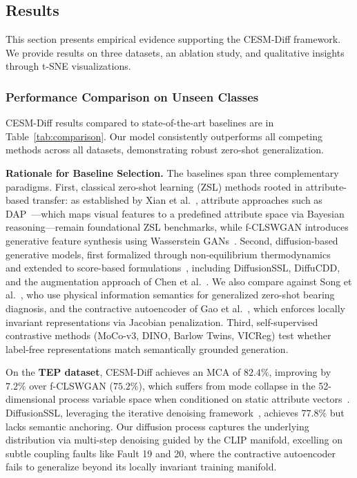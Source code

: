\subsection{Results}
\label{sec:results}

This section presents empirical evidence supporting the CESM-Diff framework. We provide results on three datasets, an ablation study, and qualitative insights through t-SNE visualizations.

\subsubsection{Performance Comparison on Unseen Classes}
CESM-Diff results compared to state-of-the-art baselines are in Table~\ref{tab:comparison}. Our model consistently outperforms all competing methods across all datasets, demonstrating robust zero-shot generalization.

\textbf{Rationale for Baseline Selection.}
The baselines span three complementary paradigms. First, classical zero-shot learning (ZSL) methods rooted in attribute-based transfer: as established by Xian et al.~\cite{xian2019zero}, attribute approaches such as DAP~\cite{lampert2009learning}---which maps visual features to a predefined attribute space via Bayesian reasoning---remain foundational ZSL benchmarks, while f-CLSWGAN introduces generative feature synthesis using Wasserstein GANs~\cite{goodfellow2014generative}. Second, diffusion-based generative models, first formalized through non-equilibrium thermodynamics~\cite{sohl2015deep} and extended to score-based formulations~\cite{song2020score}, including DiffusionSSL, DiffuCDD, and the augmentation approach of Chen et al.~\cite{chen2024diffusion}. We also compare against Song et al.~\cite{song2025generalized}, who use physical information semantics for generalized zero-shot bearing diagnosis, and the contractive autoencoder of Gao et al.~\cite{gao2019contractive}, which enforces locally invariant representations via Jacobian penalization. Third, self-supervised contrastive methods (MoCo-v3, DINO, Barlow Twins, VICReg) test whether label-free representations match semantically grounded generation.

On the \textbf{TEP dataset}, CESM-Diff achieves an MCA of $82.4\%$, improving by $7.2\%$ over f-CLSWGAN ($75.2\%$), which suffers from mode collapse in the 52-dimensional process variable space when conditioned on static attribute vectors~\cite{goodfellow2014generative}. DiffusionSSL, leveraging the iterative denoising framework~\cite{sohl2015deep}, achieves $77.8\%$ but lacks semantic anchoring. Our diffusion process captures the underlying distribution via multi-step denoising guided by the CLIP manifold, excelling on subtle coupling faults like Fault 19 and 20, where the contractive autoencoder~\cite{gao2019contractive} fails to generalize beyond its locally invariant training manifold.


